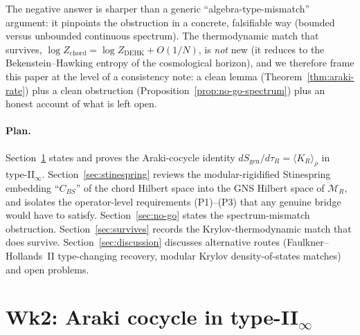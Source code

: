 \documentclass[12pt,a4paper]{article}
\theoremstyle{definition}
\begin{document}
The negative answer is sharper than a generic ``algebra-type-mismatch''
argument: it pinpoints the obstruction in a concrete, falsifiable way
(bounded versus unbounded continuous spectrum). The thermodynamic match
that survives, $\log Z_{\mathrm{chord}}=\log Z_{\mathrm{DEHK}}+O(1/N)$, is
\emph{not} new (it reduces to the Bekenstein--Hawking entropy of the
cosmological horizon), and we therefore frame this paper at the level of a
consistency note: a clean lemma (Theorem~\ref{thm:araki-rate}) plus a
clean obstruction (Proposition~\ref{prop:no-go-spectrum}) plus an honest
account of what is left open.

\paragraph{Plan.}
Section~\ref{sec:araki} states and proves the Araki-cocycle identity
$dS_{\mathrm{gen}}/d\tau_R = \langle K_R \rangle_\rho$ in
type-II$_\infty$. Section~\ref{sec:stinespring} reviews the
modular-rigidified Stinespring embedding ``$C_{BS}$'' of the chord
Hilbert space into the GNS Hilbert space of $\mathcal{M}_R$, and isolates
the operator-level requirements (P1)--(P3) that any genuine bridge would
have to satisfy. Section~\ref{sec:no-go} states the spectrum-mismatch
obstruction. Section~\ref{sec:survives} records the Krylov-thermodynamic
match that does survive. Section~\ref{sec:discussion} discusses
alternative routes (Faulkner--Hollands~II type-changing recovery, modular
Krylov density-of-states matches) and open problems.

\section{Wk2: Araki cocycle in type-II$_\infty$}
\label{sec:araki}
\end{document}
